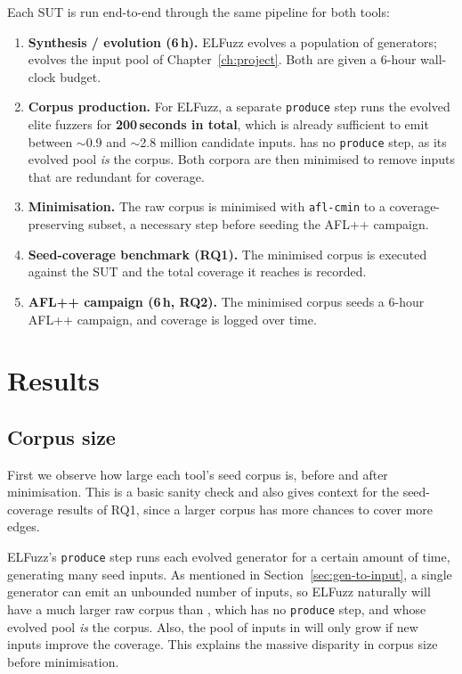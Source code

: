 Each SUT is run end-to-end through the same pipeline for both tools:

\begin{enumerate}
    \item \textbf{Synthesis / evolution (6\,h).} ELFuzz evolves a population of generators; \toolname{} evolves the input pool of Chapter~\ref{ch:project}. Both are given a 6-hour wall-clock budget.
    \item \textbf{Corpus production.} For ELFuzz, a separate \texttt{produce} step runs the evolved elite fuzzers for \textbf{200\,seconds in total}, which is already sufficient to emit between $\sim$0.9 and $\sim$2.8 million candidate inputs. \toolname{} has no \texttt{produce} step, as its evolved pool \textit{is} the corpus. Both corpora are then minimised to remove inputs that are redundant for coverage.
    \item \textbf{Minimisation.} The raw corpus is minimised with \texttt{afl-cmin} to a coverage-preserving subset, a necessary step before seeding the AFL++ campaign.
    \item \textbf{Seed-coverage benchmark (RQ1).} The minimised corpus is executed against the SUT and the total coverage it reaches is recorded.
    \item \textbf{AFL++ campaign (6\,h, RQ2).} The minimised corpus seeds a 6-hour AFL++ campaign, and coverage is logged over time.
\end{enumerate}

\section{Results}
\label{sec:eval-results}

\subsection{Corpus size}
\label{sec:eval-seedcount}

First we observe how large each tool's seed corpus is, before and after minimisation. This is a basic sanity check and also gives context for the seed-coverage results of RQ1, since a larger corpus has more chances to cover more edges.

ELFuzz's \texttt{produce} step runs each evolved generator for a certain amount of time, generating many seed inputs. As mentioned in Section~\ref{sec:gen-to-input}, a single generator can emit an unbounded number of inputs, so ELFuzz naturally will have a much larger raw corpus than \toolname{}, which has no \texttt{produce} step, and whose evolved pool \textit{is} the corpus. Also, the pool of inputs in \toolname{} will only grow if new inputs improve the coverage. This explains the massive disparity in corpus size before minimisation.

